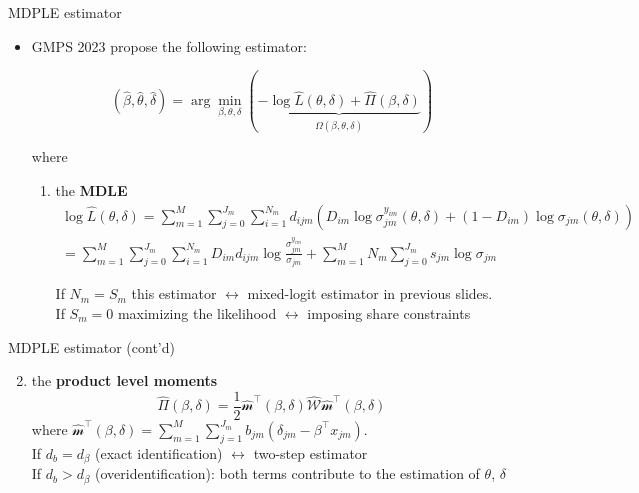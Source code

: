 \documentclass[aspectratio=169,10pt]{beamer}
\begin{document}
\begin{frame}{MDPLE estimator}

    \begin{itemize}
    
        \item GMPS 2023 propose the following estimator:
        
        \begin{equation}
            (\hat{\beta},\hat{\theta},\hat{\delta}) = \arg\min_{\beta,\theta,\delta} (\underbrace{-\log\hat{L}(\theta,\delta)+\hat{\Pi}(\beta,\delta)}_{\hat{\Omega}(\beta,\theta,\delta)})
        \end{equation}
        
        where
        
        \begin{enumerate}
            \item the \textbf{MDLE}
                \begin{align}
                    \log\hat{L}(\theta,\delta) =\sum_{m=1}^M\sum_{j=0}^{J_m}\sum_{i=1}^{N_m} d_{ijm}(D_{im}\log \sigma_{jm}^{y_{im}}(\theta,\delta) + (1-D_{im})\log\sigma_{jm}(\theta,\delta))\\
                     =\sum_{m=1}^M\sum_{j=0}^{J_m}\sum_{i=1}^{N_m} D_{im} d_{ijm} \log\frac{\sigma_{jm}^{y_{im}}}{\sigma_{jm}} + \sum_{m=1}^M N_m\sum_{j=0}^{J_m}s_{jm}\log\sigma_{jm}
                \end{align}
                
                If $N_m = S_m$ this estimator $\leftrightarrow$ mixed-logit estimator in previous slides.\\
                If $S_m = 0$ maximizing the likelihood $\leftrightarrow$ imposing share constraints
        \end{enumerate}
    \end{itemize}

\end{frame}

\begin{frame}{MDPLE estimator (cont'd)}

    \begin{enumerate}
        \setcounter{enumi}{1}
        \item the \textbf{product level moments}
        \begin{equation}
            \hat{\Pi}(\beta,\delta) = \frac{1}{2}\hat{\mathcal{m}}^\intercal(\beta,\delta)\hat{\mathcal{W}}\hat{\mathcal{m}}^\intercal(\beta,\delta)
        \end{equation}
        where $\hat{\mathcal{m}}^\intercal(\beta,\delta) = \sum_{m=1}^M \sum_{j=1}^{J_m} b_{jm}(\delta_{jm}-\beta^\intercal x_{jm})$.\\
        
        If $d_b = d_\beta$ (exact identification) $\leftrightarrow$ two-step estimator\\
        If $d_b > d_\beta$ (overidentification): both terms contribute to the estimation of $\theta$, $\delta$
    \end{enumerate}
\end{frame}
\end{document}

